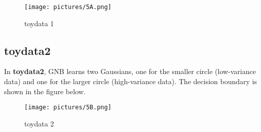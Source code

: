 \documentclass{article}
\begin{document}
\begin{figure}[ht]
  \centering
  \texttt{[image: pictures/5A.png]}
  \caption{toydata 1}
  \label{fig:toydata1}
\end{figure}

\subsection{toydata2}
In \textbf{toydata2}, GNB learns two Gaussians, one for the smaller circle (low-variance data) and one for the larger circle (high-variance data). The decision boundary is shown in the figure below.

\begin{figure}[ht]
  \centering
  \texttt{[image: pictures/5B.png]}
  \caption{toydata 2}
  \label{fig:toydata2}
\end{figure}
\end{document}
